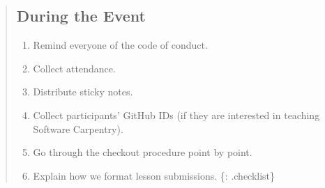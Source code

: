 \begin{quote}
\subsection{During the Event}\label{during-the-event}

\begin{enumerate}
\def\labelenumi{\arabic{enumi}.}
\itemsep1pt\parskip0pt
\item
  Remind everyone of the code of conduct.
\item
  Collect attendance.
\item
  Distribute sticky notes.
\item
  Collect participants' GitHub IDs (if they are interested in teaching
  Software Carpentry).
\item
  Go through
  the checkout procedure point by point.
\item
  Explain how we
  format lesson submissions. \{: .checklist\}
\end{enumerate}
\end{quote}

